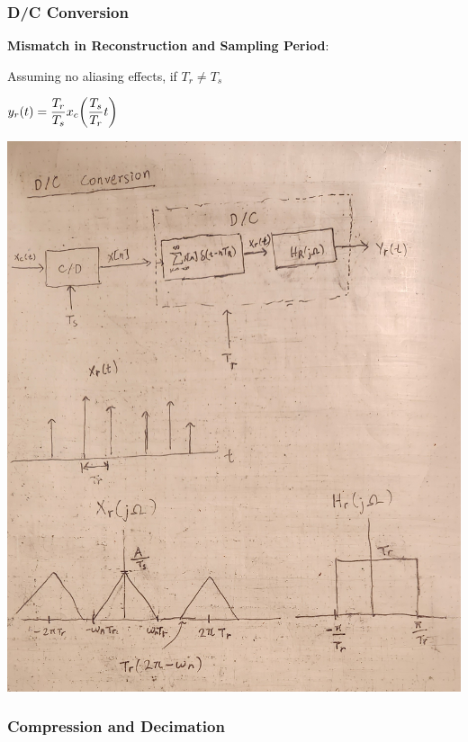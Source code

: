 \documentclass[11pt]{article}
\begin{document}
  \pagebreak

  \subsubsection{D/C Conversion}

  \small\textbf{Mismatch in Reconstruction and Sampling Period}:

  Assuming no aliasing effects, if \(T_r \neq T_s\)

  \(y_r(t) = \dfrac{T_r}{T_s}x_c{\left( \dfrac{T_s}{T_r}t \right)}\)

  \includegraphics[scale=0.2]{graphics/dc_conversion.jpg}

  \pagebreak

  \subsubsection{Compression and Decimation}
\end{document}

